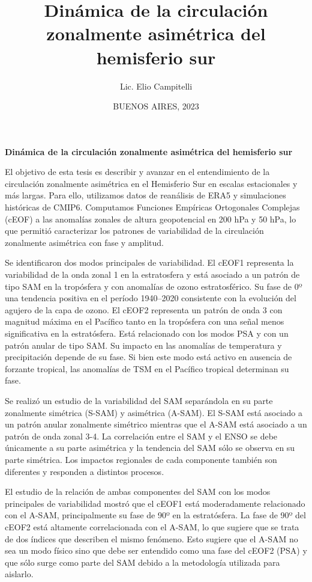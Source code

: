 \documentclass[12pt,oneside,a4paper]{reedthesis}
\title{Dinámica de la circulación zonalmente asimétrica del hemisferio sur}
\author{Lic. Elio Campitelli}
\date{BUENOS AIRES, 2023}
\begin{document}
  \maketitle

\frontmatter %
\pagestyle{empty} %


  \begin{resumen}
    \textbf{Dinámica de la circulación zonalmente asimétrica del hemisferio sur}

    El objetivo de esta tesis es describir y avanzar en el entendimiento de la circulación zonalmente asimétrica en el Hemisferio Sur en escalas estacionales y más largas.
    Para ello, utilizamos datos de reanálisis de ERA5 y simulaciones históricas de CMIP6.
    Computamos Funciones Empíricas Ortogonales Complejas (cEOF) a las anomalías zonales de altura geopotencial en 200 hPa y 50 hPa, lo que permitió caracterizar los patrones de variabilidad de la circulación zonalmente asimétrica con fase y amplitud.

    Se identificaron dos modos principales de variabilidad.
    El cEOF1 representa la variabilidad de la onda zonal 1 en la estratosfera y está asociado a un patrón de tipo SAM en la tropósfera y con anomalías de ozono estratosférico.
    Su fase de 0º una tendencia positiva en el período 1940--2020 consistente con la evolución del agujero de la capa de ozono.
    El cEOF2 representa un patrón de onda 3 con magnitud máxima en el Pacífico tanto en la tropósfera con una señal menos significativa en la estratósfera.
    Está relacionado con los modos PSA y con un patrón anular de tipo SAM.
    Su impacto en las anomalías de temperatura y precipitación depende de su fase.
    Si bien este modo está activo en ausencia de forzante tropical, las anomalías de TSM en el Pacífico tropical determinan su fase.

    Se realizó un estudio de la variabilidad del SAM separándola en su parte zonalmente simétrica (S-SAM) y asimétrica (A-SAM).
    El S-SAM está asociado a un patrón anular zonalmente simétrico mientras que el A-SAM está asociado a un patrón de onda zonal 3-4.
    La correlación entre el SAM y el ENSO se debe únicamente a su parte asimétrica y la tendencia del SAM sólo se observa en su parte simétrica.
    Los impactos regionales de cada componente también son diferentes y responden a distintos procesos.

    El estudio de la relación de ambas componentes del SAM con los modos principales de variabilidad mostró que el cEOF1 está moderadamente relacionado con el A-SAM, principalmente su fase de 90º en la estratósfera.
    La fase de 90º del cEOF2 está altamente correlacionada con el A-SAM, lo que sugiere que se trata de dos índices que describen el mismo fenómeno.
    Esto sugiere que el A-SAM no sea un modo físico sino que debe ser entendido como una fase del cEOF2 (PSA) y que sólo surge como parte del SAM debido a la metodología utilizada para aislarlo.


\end{resumen}
\end{document}
